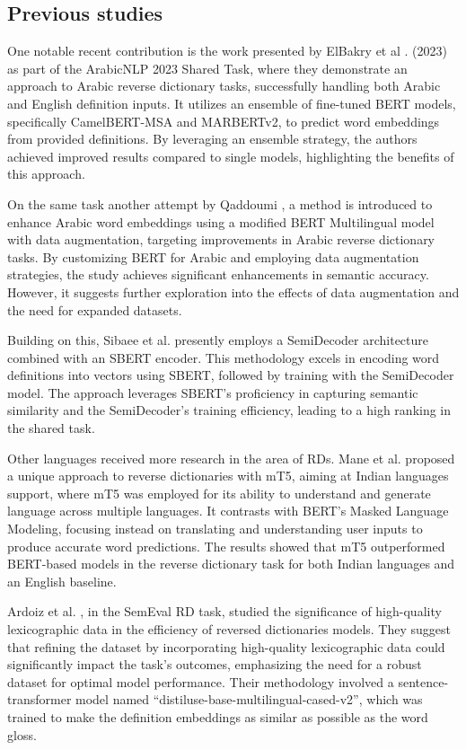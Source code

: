 \documentclass[12.5pt]{article}
\begin{document}
\subsection{Previous studies}

One notable recent contribution is the work presented by ElBakry et al \cite{Albakry2023}. (2023) as part of the ArabicNLP 2023 Shared Task, where they demonstrate an approach to Arabic reverse dictionary tasks, successfully handling both Arabic and English definition inputs. It utilizes an ensemble of fine-tuned BERT models, specifically CamelBERT-MSA and MARBERTv2, to predict word embeddings from provided definitions. By leveraging an ensemble strategy, the authors achieved improved results compared to single models, highlighting the benefits of this approach.

On the same task another attempt by Qaddoumi \cite{Qaddoumi2023}, a method is introduced to enhance Arabic word embeddings using a modified BERT Multilingual model with data augmentation, targeting improvements in Arabic reverse dictionary tasks. By customizing BERT for Arabic and employing data augmentation strategies, the study achieves significant enhancements in semantic accuracy. However, it suggests further exploration into the effects of data augmentation and the need for expanded datasets.

Building on this, Sibaee et al. \cite{Sibaee2023} presently employs a SemiDecoder architecture combined with an SBERT encoder. This methodology excels in encoding word definitions into vectors using SBERT, followed by training with the SemiDecoder model. The approach leverages SBERT's proficiency in capturing semantic similarity and the SemiDecoder's training efficiency, leading to a high ranking in the shared task.

Other languages received more research in the area of RDs. Mane et al. \cite{Mane2022} proposed a unique approach to reverse dictionaries with mT5, aiming at Indian languages support, where mT5 was employed for its ability to understand and generate language across multiple languages. It contrasts with BERT's Masked Language Modeling, focusing instead on translating and understanding user inputs to produce accurate word predictions. The results showed that mT5 outperformed BERT-based models in the reverse dictionary task for both Indian languages and an English baseline.

Ardoiz et al. \cite{Ardoiz2022}, in the SemEval RD task, studied the significance of high-quality lexicographic data in the efficiency of reversed dictionaries models. They suggest that refining the dataset by incorporating high-quality lexicographic data could significantly impact the task's outcomes, emphasizing the need for a robust dataset for optimal model performance. Their methodology involved a sentence-transformer model named “distiluse-base-multilingual-cased-v2”, which was trained to make the definition embeddings as similar as possible as the word gloss.
\end{document}
